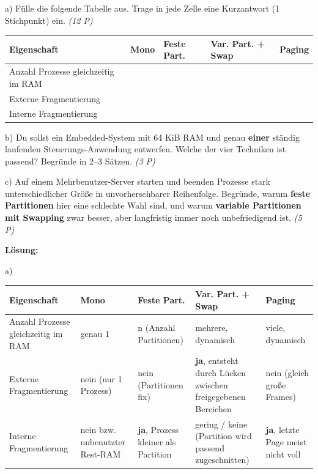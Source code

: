 \documentclass[11pt, a4paper]{article}
\begin{document}
a) Fülle die folgende Tabelle aus. Trage in jede Zelle eine Kurzantwort (1 Stichpunkt) ein. \textit{(12 P)}



{\small
\begin{tabularx}{\linewidth}{XXXXX}
\hline
\rowcolor{tableheadbg}
{\color{white}\textbf{Eigenschaft}} & {\color{white}\textbf{Mono}} & {\color{white}\textbf{Feste Part.}} & {\color{white}\textbf{Var. Part. + Swap}} & {\color{white}\textbf{Paging}} \\[2pt]
\hline
\endhead
\hline
\endfoot
Anzahl Prozesse gleichzeitig im RAM &  &  &  &  \\
Externe Fragmentierung &  &  &  &  \\
Interne Fragmentierung &  &  &  &  \\
\end{tabularx}
}


b) Du sollst ein Embedded-System mit 64 KiB RAM und genau \textbf{einer} ständig laufenden Steuerungs-Anwendung entwerfen. Welche der vier Techniken ist passend? Begründe in 2–3 Sätzen. \textit{(3 P)}


c) Auf einem Mehrbenutzer-Server starten und beenden Prozesse stark unterschiedlicher Größe in unvorhersehbarer Reihenfolge. Begründe, warum \textbf{feste Partitionen} hier eine schlechte Wahl sind, und warum \textbf{variable Partitionen mit Swapping} zwar besser, aber langfristig immer noch unbefriedigend ist. \textit{(5 P)}


\textbf{Lösung:}


a)



{\small
\begin{tabularx}{\linewidth}{XXXXX}
\hline
\rowcolor{tableheadbg}
{\color{white}\textbf{Eigenschaft}} & {\color{white}\textbf{Mono}} & {\color{white}\textbf{Feste Part.}} & {\color{white}\textbf{Var. Part. + Swap}} & {\color{white}\textbf{Paging}} \\[2pt]
\hline
\endhead
\hline
\endfoot
Anzahl Prozesse gleichzeitig im RAM & genau 1 & n (Anzahl Partitionen) & mehrere, dynamisch & viele, dynamisch \\
Externe Fragmentierung & nein (nur 1 Prozess) & nein (Partitionen fix) & \textbf{ja}, entsteht durch Lücken zwischen freigegebenen Bereichen & nein (gleich große Frames) \\
Interne Fragmentierung & nein bzw. unbenutzter Rest-RAM & \textbf{ja}, Prozess kleiner als Partition & gering / keine (Partition wird passend zugeschnitten) & \textbf{ja}, letzte Page meist nicht voll \\
\end{tabularx}
}
\end{document}
